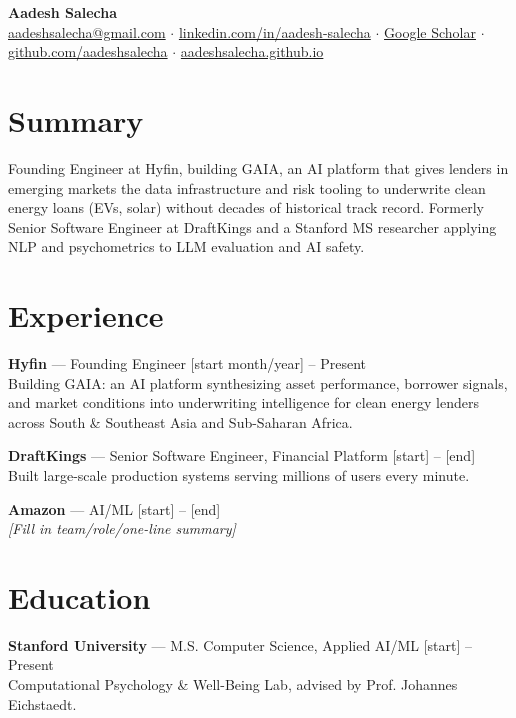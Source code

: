 \documentclass[10.5pt]{article}
\begin{document}
\begin{center}
  {\LARGE \textbf{Aadesh Salecha}}\\[0.35em]
  \href{mailto:aadeshsalecha@gmail.com}{aadeshsalecha@gmail.com} \quad $\cdot$ \quad
  \href{https://www.linkedin.com/in/aadesh-salecha}{linkedin.com/in/aadesh-salecha} \quad $\cdot$ \quad
  \href{https://scholar.google.com/citations?hl=en&user=Cnwzl3oAAAAJ}{Google Scholar} \quad $\cdot$ \quad
  \href{https://github.com/aadeshsalecha/}{github.com/aadeshsalecha} \quad $\cdot$ \quad
  \href{https://aadeshsalecha.github.io}{aadeshsalecha.github.io}
\end{center}

\section*{Summary}
Founding Engineer at Hyfin, building GAIA, an AI platform that gives lenders in emerging markets the
data infrastructure and risk tooling to underwrite clean energy loans (EVs, solar) without decades of
historical track record. Formerly Senior Software Engineer at DraftKings and a Stanford MS researcher
applying NLP and psychometrics to LLM evaluation and AI safety.

\section*{Experience}

\textbf{Hyfin} --- Founding Engineer \hfill [start month/year] -- Present \\
Building GAIA: an AI platform synthesizing asset performance, borrower signals, and market
conditions into underwriting intelligence for clean energy lenders across South \& Southeast Asia
and Sub-Saharan Africa.

\textbf{DraftKings} --- Senior Software Engineer, Financial Platform \hfill [start] -- [end] \\
Built large-scale production systems serving millions of users every minute.

\textbf{Amazon} --- AI/ML \hfill [start] -- [end] \\
{\small \textit{[Fill in team/role/one-line summary]}}

\section*{Education}

\textbf{Stanford University} --- M.S. Computer Science, Applied AI/ML \hfill [start] -- Present \\
Computational Psychology \& Well-Being Lab, advised by Prof. Johannes Eichstaedt.
\end{document}
